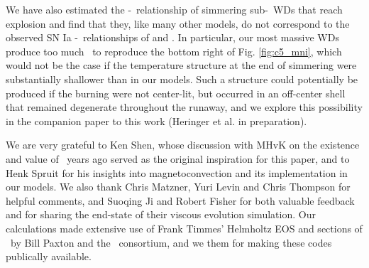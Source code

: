 
We have also estimated the \Mtot-\MNi\ relationship of simmering sub-\Mch\ WDs that reach explosion and find that they, like many other models, do not correspond to the observed SN Ia \Mtot-\MNi\ relationships of \cite{scalzrs14} and \cite{chil+15}.  In particular, our most massive WDs produce too much \Ni\ to reproduce the bottom right of Fig. \ref{fig:c5_mni}, which would not be the case if the temperature structure at the end of simmering were substantially shallower than in our models.  Such a structure could potentially be produced if the burning were not center-lit, but occurred in an off-center shell that remained degenerate throughout the runaway, and we explore this possibility in the companion paper to this work (Heringer et al. in preparation).

\vspace{5mm}

We are very grateful to Ken Shen, whose discussion with MHvK on the existence and value of \Mcrit\ years ago served as the original inspiration for this paper, and to Henk Spruit for his insights into magnetoconvection and its implementation in our models.  We also thank Chris Matzner, Yuri Levin and Chris Thompson for helpful comments, and Suoqing Ji and Robert Fisher for both valuable feedback and for sharing the end-state of their viscous evolution simulation.  Our calculations made extensive use of Frank Timmes' Helmholtz EOS and sections of \mesa\ by Bill Paxton and the \mesa\ consortium, and we them for making these codes publically available.  



